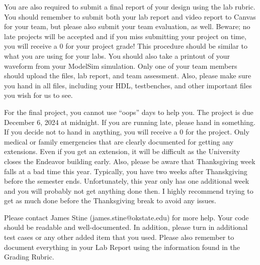 \documentclass{article}
\begin{document}
You are also required to submit a final report of your design using
the lab rubric.  You should remember to submit both your lab report
and video report to Canvas for
your team, but please also submit your team evaluation, as well.
Beware; no
late projects will be accepted and if you miss submitting your project
on time, you will receive a $0$ for your project grade!  This
procedure should be similar to what you are using for your labs.
You should also take a printout of your waveform 
from your ModelSim simulation.  
Only one of your team members should upload
the files, lab report, and team assessment.  Also, please make sure you
hand in all files, including your HDL, testbenches, and other
important files you wish for us to see.

For the final project, you cannot use ``oops'' days to help you.  The
project is due December 6, 2024 at midnight.  If you are running late,
please hand in something.  If you decide not to hand in anything, you
will receive a $0$ for the project.   Only medical or family
emergencies that are clearly documented for getting any extensions.
Even if you get an extension, it will be difficult as the University
closes the Endeavor building early.  Also, please be aware that
Thanksgiving week falls at a bad time this year. Typically, you have
two weeks after Thanskgiving before the semester ends.  Unfortunately,
this year only has one additional week and you will probably not get
anything done then.  I highly recommend trying to get as much done
before the Thanksgiving break to avoid any issues.  

Please contact James Stine (james.stine@okstate.edu) 
for more help.  Your code should be
readable and well-documented. In addition, please turn in additional
test cases or any other added item that you used. 
Please also remember to document everything in your Lab Report using
the information found in the Grading Rubric.

   


\end{document}
